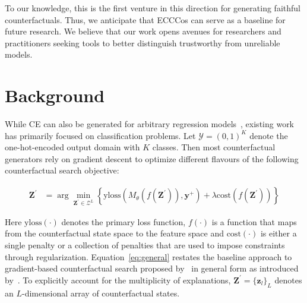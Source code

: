 \documentclass{article}
\begin{document}
To our knowledge, this is the first venture in this direction for generating faithful counterfactuals. Thus, we anticipate that ECCCos can serve as a baseline for future research. We believe that our work opens avenues for researchers and practitioners seeking tools to better distinguish trustworthy from unreliable models.

\section{Background}\label{background}

While CE can also be generated for arbitrary regression models~\citep{spooner2021counterfactual}, existing work has primarily focused on classification problems. Let $\mathcal{Y}=(0,1)^K$ denote the one-hot-encoded output domain with $K$ classes. Then most counterfactual generators rely on gradient descent to optimize different flavours of the following counterfactual search objective:

\begin{equation} \label{eq:general}
\begin{aligned}
\mathbf{Z}^\prime &= \arg \min_{\mathbf{Z}^\prime \in \mathcal{Z}^L} \left\{  {\text{yloss}(M_{\theta}(f(\mathbf{Z}^\prime)),\mathbf{y}^+)}+ \lambda {\text{cost}(f(\mathbf{Z}^\prime)) }  \right\} 
\end{aligned} 
\end{equation}

Here $\text{yloss}(\cdot)$ denotes the primary loss function, $f(\cdot)$ is a function that maps from the counterfactual state space to the feature space and $\text{cost}(\cdot)$ is either a single penalty or a collection of penalties that are used to impose constraints through regularization. Equation~\ref{eq:general} restates the baseline approach to gradient-based counterfactual search proposed by~\citet{wachter2017counterfactual} in general form as introduced by~\citet{altmeyer2023endogenous}. To explicitly account for the multiplicity of explanations, $\mathbf{Z}^\prime=\{ \mathbf{z}_l\}_L$ denotes an $L$-dimensional array of counterfactual states. 
\end{document}
